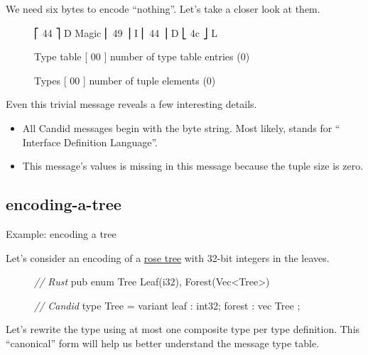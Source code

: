 \documentclass{article}
\begin{document}
We need six bytes to encode ``nothing''.
Let's take a closer look at them.

\begin{figure}
\begin{code}[ascii]
           ⎡ 44 ⎤ D
    Magic  ⎢ 49 ⎥ I
           ⎢ 44 ⎥ D
           ⎣ 4c ⎦ L

Type table [ 00 ] number of type table entries (0)

    Types  [ 00 ] number of tuple elements (0)
\end{code}
\end{figure}

Even this trivial message reveals a few interesting details.

\begin{itemize}
    \item
    All Candid messages begin with the  byte string.
    Most likely,  stands for `` Interface Definition Language''.
    \item
    This message's values is missing in this message because the tuple size is zero.
\end{itemize}

\subsection{encoding-a-tree}{Example: encoding a tree}

Let's consider an encoding of a \href{https://en.wikipedia.org/wiki/Rose_tree}{rose tree} with 32-bit integers in the leaves.

\begin{figure}
\begin{code}[rust]
\emph{// Rust}
pub enum Tree { Leaf(i32), Forest(Vec<Tree>) }
\end{code}
\begin{code}[candid]
\emph{// Candid}
type Tree = variant { leaf : int32; forest : vec Tree };
\end{code}
\end{figure}

Let's rewrite the  type using at most one composite type per type definition.
This ``canonical'' form will help us better understand the message type table.
\end{document}
